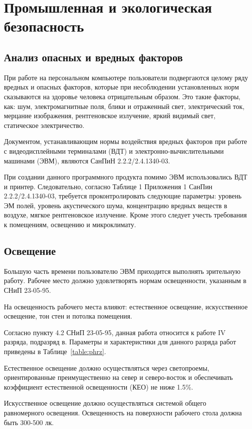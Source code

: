 \chapter{Промышленная и экологическая безопасность}

\section{Анализ опасных и вредных факторов}
При работе на персональном компьютере пользователи подвергаются целому ряду вредных и опасных факторов, которые при несоблюдении установленных норм сказываются на здоровье человека отрицательным образом. Это такие факторы, как: шум, электромагнитные поля, блики и отраженный свет, электрический ток, мерцание изображения, рентгеновское излучение, яркий видимый свет, статическое электричество.

Документом, устанавливающим нормы воздействия вредных факторов при работе с видеодисплейными терминалами (ВДТ) и электронно-вычислительными машинами (ЭВМ), являются СанПиН 2.2.2/2.4.1340-03.

При создании данного программного  продукта помимо ЭВМ использовались ВДТ и принтер. Следовательно, согласно Таблице 1 Приложения 1 СанПин 2.2.2/2.4.1340-03, требуется проконтролировать следующие параметры: уровень ЭМ полей, уровень акустического шума, концентрацию вредных веществ в воздухе, мягкое рентгеновское излучение. Кроме этого следует учесть требования к помещениям, освещению и микроклимату.

\section{Освещение}
Большую часть времени пользователю ЭВМ приходится выполнять зрительную работу. Рабочее место должно удовлетворять нормам освещенности, указанным в СНиП 23-05-95.

На освещенность рабочего места влияют: естественное освещение, искусственное освещение, тон стен и потолка помещения.

Согласно пункту 4.2 СНиП 23-05-95, данная работа относится к работе IV разряда, подразряд в. Параметры и характеристики для данного разряда работ приведены в Таблице~\ref{table:phrz}.

Естественное освещение должно осуществляться через светопроемы, ориентированные преимущественно на север и северо-восток и обеспечивать коэффициент естественной освещенности (КЕО) не ниже 1.5\%.

Искусственное освещение должно осуществляться системой общего равномерного освещения. Освещенность на поверхности рабочего стола должна быть 300-500 лк.

